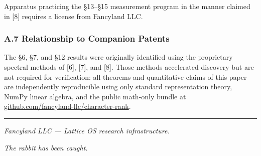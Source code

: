 \documentclass[
  11pt,
]{article}
\begin{document}
Apparatus practicing the §13--§15 measurement program in the manner
claimed in {[}8{]} requires a license from Fancyland LLC.

\subsubsection{A.7 Relationship to Companion
Patents}\label{a.7-relationship-to-companion-patents}

The §6, §7, and §12 results were originally identified using the
proprietary spectral methods of {[}6{]}, {[}7{]}, and {[}8{]}. Those
methods accelerated discovery but are not required for verification: all
theorems and quantitative claims of this paper are independently
reproducible using only standard representation theory, NumPy linear
algebra, and the public math-only bundle at
\href{https://github.com/fancyland-llc/character-rank}{github.com/fancyland-llc/character-rank}.

\vspace{3em}
\begin{center}
\rule{0.4\textwidth}{0.5pt}

\vspace{0.8em}

\textit{Fancyland LLC --- Lattice OS research infrastructure.}

\vspace{0.3em}

\textit{The rabbit has been caught.}
\end{center}
\end{document}
